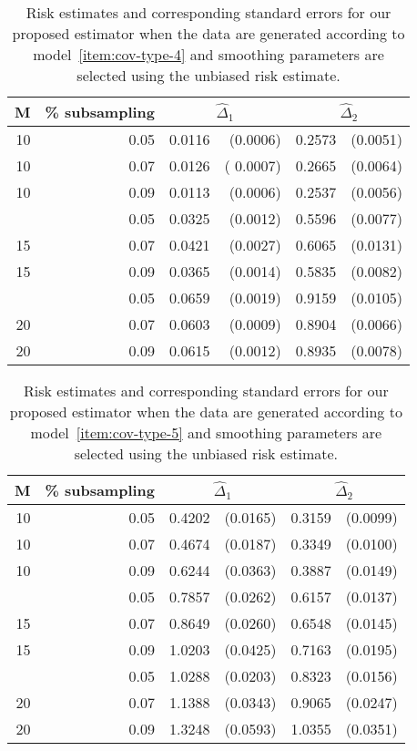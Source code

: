 \documentclass[12pt]{article}
\theoremstyle{definition}
\begin{document}
\begin{table}[H] \label{table:simulation-2-sigma-4}
\centering
\begin{tabular}{rrrrrr}
M & \% subsampling &  \multicolumn{2}{c}{$\hat{\Delta}_1$}  &  \multicolumn{2}{c}{$\hat{\Delta}_2$} \\ 
 \hline
10 & 0.05 & 0.0116 & (0.0006) & 0.2573 & (0.0051) \\ 
  10 & 0.07 & 0.0126 &( 0.0007) & 0.2665 & (0.0064) \\ 
  10 & 0.09 & 0.0113 & (0.0006) & 0.2537 & (0.0056) \\ 
    \hdashline
  15 & 0.05 & 0.0325 & (0.0012) & 0.5596 & (0.0077) \\ 
  15 & 0.07 & 0.0421 & (0.0027) & 0.6065 & (0.0131) \\ 
  15 & 0.09 & 0.0365 & (0.0014) & 0.5835 & (0.0082) \\ 
    \hdashline
  20 & 0.05 & 0.0659 & (0.0019) & 0.9159 & (0.0105) \\ 
  20 & 0.07 & 0.0603 & (0.0009) & 0.8904 & (0.0066) \\ 
  20 & 0.09 & 0.0615 & (0.0012) & 0.8935 & (0.0078) \\ 
   \hline
\end{tabular}
\caption{Risk estimates and corresponding standard errors for our proposed estimator when the data are generated according to model~\ref{item:cov-type-4}  and smoothing parameters are selected using the unbiased risk estimate.} 
\end{table}
\begin{table}[H] \label{table:simulation-2-sigma-5}
\centering
\begin{tabular}{rrrrrr}
M & \% subsampling &  \multicolumn{2}{c}{$\hat{\Delta}_1$}  &  \multicolumn{2}{c}{$\hat{\Delta}_2$} \\ 
  \hline
10 & 0.05 & 0.4202 & (0.0165) & 0.3159 & (0.0099) \\ 
  10 & 0.07 & 0.4674 & (0.0187) & 0.3349 & (0.0100) \\ 
  10 & 0.09 & 0.6244 & (0.0363) & 0.3887 & (0.0149) \\ 
  \hdashline
  15 & 0.05 & 0.7857 & (0.0262) & 0.6157 & (0.0137) \\ 
  15 & 0.07 & 0.8649 & (0.0260) & 0.6548 & (0.0145) \\ 
  15 & 0.09 & 1.0203 & (0.0425) & 0.7163 & (0.0195) \\ 
    \hdashline
  20 & 0.05 & 1.0288 & (0.0203) & 0.8323 & (0.0156) \\ 
  20 & 0.07 & 1.1388 & (0.0343) & 0.9065 & (0.0247) \\ 
  20 & 0.09 & 1.3248 & (0.0593) & 1.0355 & (0.0351) \\ 
   \hline
\end{tabular}
\caption{Risk estimates and corresponding standard errors for our proposed estimator when the data are generated according to model~\ref{item:cov-type-5} and smoothing parameters are selected using the unbiased risk estimate.} 
\end{table}
\end{document}
